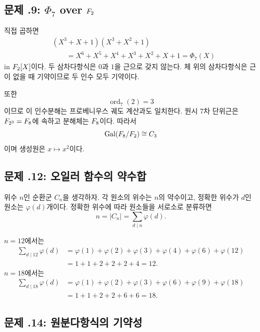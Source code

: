 \subsection*{문제 \thechapter.9: $\Phi_7$ over $F_2$}

\begin{solution}
직접 곱하면
\[
\begin{aligned}
 &(X^3+X+1)(X^3+X^2+1)\\
 &\qquad=X^6+X^5+X^4+X^3+X^2+X+1
 =\Phi_7(X)
\end{aligned}
\]
in $F_2[X]$이다. 두 삼차다항식은 $0$과 $1$을 근으로 갖지 않는다. 체 위의 삼차다항식은 근이 없을 때 기약이므로 두 인수 모두 기약이다.

또한
\[
  \operatorname{ord}_7(2)=3
\]
이므로 이 인수분해는 프로베니우스 궤도 계산과도 일치한다. 원시 $7$차 단위근은 $F_{2^3}=F_8$에 속하고 분해체는 $F_8$이다. 따라서
\[
  \operatorname{Gal}(F_8/F_2)\cong C_3
\]
이며 생성원은 $x\mapsto x^2$이다.
\end{solution}

\subsection*{문제 \thechapter.12: 오일러 함수의 약수합}

\begin{solution}
위수 $n$인 순환군 $C_n$을 생각하자. 각 원소의 위수는 $n$의 약수이고, 정확한 위수가 $d$인 원소는 $\varphi(d)$개이다. 정확한 위수에 따라 원소들을 서로소로 분류하면
\[
  n=|C_n|=\sum_{d\mid n}\varphi(d).
\]

$n=12$에서는
\[
\begin{aligned}
 \sum_{d\mid12}\varphi(d)
 &=\varphi(1)+\varphi(2)+\varphi(3)
   +\varphi(4)+\varphi(6)+\varphi(12)\\
 &=1+1+2+2+2+4=12.
\end{aligned}
\]
$n=18$에서는
\[
\begin{aligned}
 \sum_{d\mid18}\varphi(d)
 &=\varphi(1)+\varphi(2)+\varphi(3)
   +\varphi(6)+\varphi(9)+\varphi(18)\\
 &=1+1+2+2+6+6=18.
\end{aligned}
\]
\end{solution}

\subsection*{문제 \thechapter.14: 원분다항식의 기약성}

